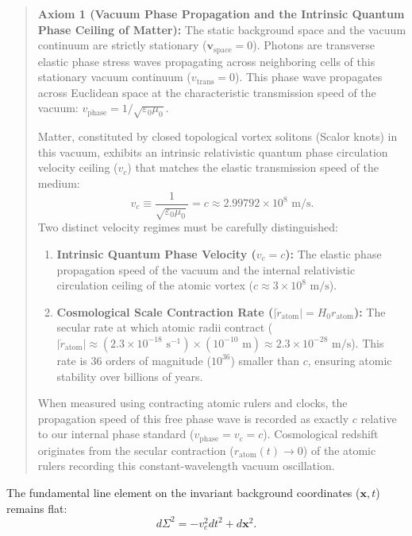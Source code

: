 \begin{quote}
    \textbf{Axiom 1 (Vacuum Phase Propagation and the Intrinsic Quantum Phase Ceiling of Matter):}
    The static background space and the vacuum continuum are strictly stationary ($\mathbf{v}_{\mathrm{space}} = 0$). Photons are transverse elastic phase stress waves propagating across neighboring cells of this stationary vacuum continuum ($v_{\mathrm{trans}} = 0$). This phase wave propagates across Euclidean space at the characteristic transmission speed of the vacuum: $v_{\mathrm{phase}} = 1/\sqrt{\varepsilon_0\mu_0}$.

    Matter, constituted by closed topological vortex solitons (Scalor knots) in this vacuum, exhibits an intrinsic relativistic quantum phase circulation velocity ceiling ($v_c$) that matches the elastic transmission speed of the medium:
    \begin{equation}
        v_c \equiv \frac{1}{\sqrt{\varepsilon_0\mu_0}} = c \approx 2.99792 \times 10^8 \text{ m/s}.
        \label{eq:buzulme_hizi_tanim}
    \end{equation}
    Two distinct velocity regimes must be carefully distinguished:
    \begin{enumerate}
        \item \textbf{Intrinsic Quantum Phase Velocity ($v_c = c$):} The elastic phase propagation speed of the vacuum and the internal relativistic circulation ceiling of the atomic vortex ($c \approx 3 \times 10^8\text{ m/s}$).
        \item \textbf{Cosmological Scale Contraction Rate ($|\dot{r}_{\mathrm{atom}}| = H_0 r_{\mathrm{atom}}$):} The secular rate at which atomic radii contract ($|\dot{r}_{\mathrm{atom}}| \approx (2.3 \times 10^{-18}\text{ s}^{-1}) \times (10^{-10}\text{ m}) \approx 2.3 \times 10^{-28}\text{ m/s}$). This rate is 36 orders of magnitude ($10^{36}$) smaller than $c$, ensuring atomic stability over billions of years.
    \end{enumerate}
    When measured using contracting atomic rulers and clocks, the propagation speed of this free phase wave is recorded as exactly $c$ relative to our internal phase standard ($v_{\mathrm{phase}} = v_c = c$). Cosmological redshift originates from the secular contraction ($r_{\mathrm{atom}}(t) \to 0$) of the atomic rulers recording this constant-wavelength vacuum oscillation.
\end{quote}

The fundamental line element on the invariant background coordinates ($\mathbf{x}, t$) remains flat:
\begin{equation}
    d\Sigma^2 = -v_c^2 dt^2 + d\mathbf{x}^2.
    \label{eq:statik_arkaplan_metrigi}
\end{equation}

